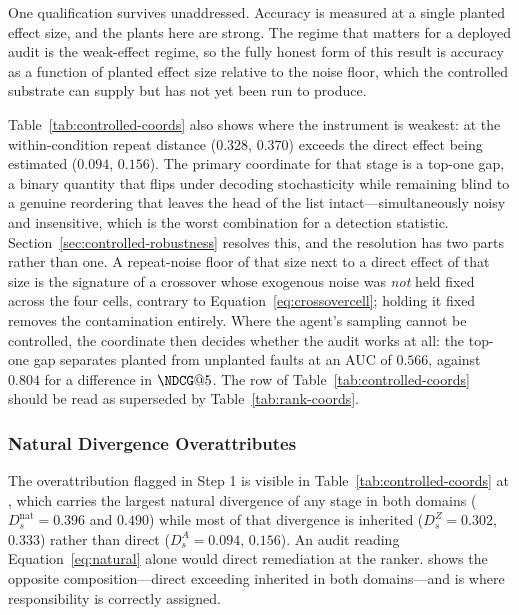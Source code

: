 One qualification survives unaddressed. Accuracy is measured at a single planted effect size, and
the plants here are strong. The regime that matters for a deployed audit is the weak-effect
regime, so the fully honest form of this result is accuracy as a function of planted effect size
relative to the noise floor, which the controlled substrate can supply but has not yet been run to
produce.

Table~\ref{tab:controlled-coords} also shows where the instrument is weakest: at 
the within-condition repeat distance ($0.328$, $0.370$) exceeds the direct effect being estimated
($0.094$, $0.156$). The primary coordinate for that stage is a top-one gap, a binary quantity that
flips under decoding stochasticity while remaining blind to a genuine reordering that leaves the
head of the list intact---simultaneously noisy and insensitive, which is the worst combination for
a detection statistic. Section~\ref{sec:controlled-robustness} resolves this, and the resolution
has two parts rather than one. A repeat-noise floor of that size next to a direct effect of that
size is the signature of a crossover whose exogenous noise was \emph{not} held fixed across the
four cells, contrary to Equation~\eqref{eq:crossovercell}; holding it fixed removes the
contamination entirely. Where the agent's sampling cannot be controlled, the coordinate then
decides whether the audit works at all: the top-one gap separates planted from unplanted
 faults at an AUC of $0.566$, against $0.804$ for a difference in $\NDCG@5$. The
 row of Table~\ref{tab:controlled-coords} should be read as superseded by
Table~\ref{tab:rank-coords}.

\subsubsection{Natural Divergence Overattributes}
\label{sec:rq2}

The overattribution flagged in Step 1 is visible in Table~\ref{tab:controlled-coords} at
, which carries the largest natural divergence of any stage in both domains
($D_s^{\mathrm{nat}} = 0.396$ and $0.490$) while most of that divergence is inherited
($D_s^{Z} = 0.302$, $0.333$) rather than direct ($D_s^{A} = 0.094$, $0.156$). An audit reading
Equation~\eqref{eq:natural} alone would direct remediation at the ranker.
 shows the opposite composition---direct exceeding inherited in both
domains---and is where responsibility is correctly assigned.

